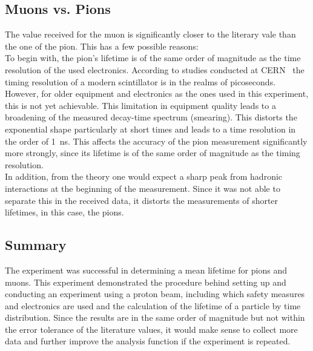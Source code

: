 \documentclass[11pt,a4paper]{article}
\begin{document}
\subsection{Muons vs. Pions}
The value received for the muon is significantly closer to the literary vale than the one of the pion. This has a few possible reasons: \\
To begin with, the pion's lifetime is of the same order of magnitude as the time resolution of the used electronics. According to studies conducted at CERN~\cite{Scintillator timing resolution} the timing resolution of a modern scintillator is in the realms of picoseconds. However, for older equipment and electronics as the ones used in this experiment, this is not yet achievable. This limitation in equipment quality leads to a broadening of the measured decay-time spectrum (smearing).
This distorts the exponential shape particularly at short times and leads to a time resolution in the order of \SI{1}{ns}. This affects the accuracy of the pion measurement significantly more strongly, since its lifetime is of the same order of magnitude as the timing resolution. \\
In addition, from the theory one would expect a sharp peak from hadronic interactions at the beginning of the measurement. Since it was not able to separate this in the received data, it distorts the measurements of shorter lifetimes, in this case, the pions.





\subsection{Summary}
The experiment was successful in determining a mean lifetime for pions and muons. 
This experiment demonstrated the procedure behind setting up and conducting an experiment using a proton beam, including which safety measures and electronics are used and the calculation of the lifetime of a particle by time distribution. Since the results are in the same order of magnitude but not within the error tolerance of the literature values, it would make sense to collect more data and further improve the analysis function if the experiment is repeated.











\newpage
\end{document}
